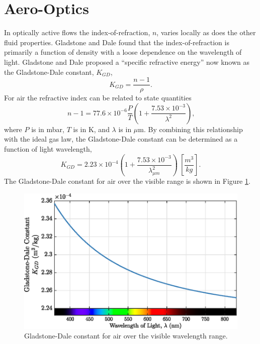 \section{Aero-Optics}
In optically active flows the index-of-refraction, $n$, varies locally as does the other fluid properties.
Gladstone and Dale \cite{Gladstone-1863-ND4wtDT9} found that the index-of-refraction is primarily a function of density with a loose dependence on the wavelength of light.
Gladstone and Dale proposed a ``specific refractive energy'' now known as the Gladstone-Dale constant, $K_{GD}$,
\begin{equation}
  K_{GD} = \frac{n-1}{\rho}\textrm{.}
  \label{eqn:02_gladstone_dale_constant}
\end{equation}
For air the refractive index can be related to state quantities \cite{Valley-1965-F3k3cmv6}
\begin{equation}
  n-1 = 77.6\times 10^{-6}\frac{P}{T}\left(1+\frac{7.53\times10^{-3}}{\lambda^2}\right)\textrm{,}
  \label{eqn:02_refractive_index_ptlambda}
\end{equation}
where $P$ is in mbar, $T$ is in K, and $\lambda$ is in $\mu$m.
By combining this relationship with the ideal gas law, the Gladstone-Dale constant can be determined as a function of light wavelength,
\begin{equation}
  K_{GD} = 2.23\times10^{-4}\left(1+\frac{7.53\times10^{-3}}{\lambda_{\mu m}^2}\right) \: \left[\frac{m^3}{kg}\right]\textrm{.}
  \label{eqn:02_gladstone_dale_wavelength}
\end{equation}
The Gladstone-Dale constant for air over the visible range is shown in Figure \ref{fig:02_gladstone_dale_wavelength}.
\begin{figure}
  \centering
  \includegraphics{../matlab/02_background/gladstone_dale_wavelength.eps}
  \caption{Gladstone-Dale constant for air over the visible wavelength range.}
  \label{fig:02_gladstone_dale_wavelength}
\end{figure}
